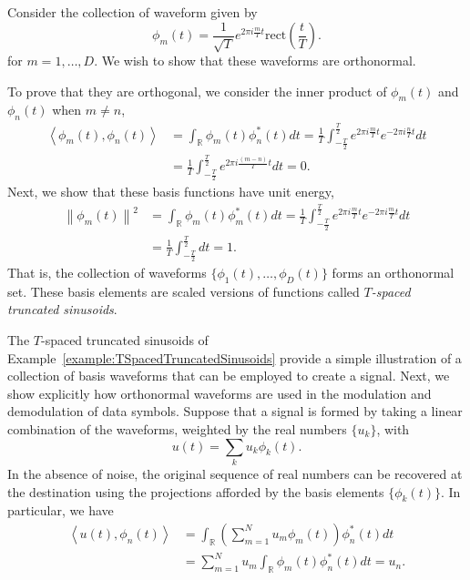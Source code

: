\begin{example} \label{example:TSpacedTruncatedSinusoids}
Consider the collection of waveform given by
\begin{equation*}
\phi_m(t) = \frac{1}{\sqrt{T}} e^{2 \pi i \frac{m}{T} t} \mathrm{rect} \left( \frac{t}{T} \right) .
\end{equation*}
for $m = 1, \ldots, D$.
We wish to show that these waveforms are orthonormal.

To prove that they are orthogonal, we consider the inner product of $\phi_m(t)$ and $\phi_n(t)$ when $m \neq n$,
\begin{equation*}
\begin{split}
\left\langle \phi_m (t), \phi_n (t) \right\rangle
&= \int_{\mathbb{R}} \phi_m (t) \phi_n^* (t) dt 
= \frac{1}{T} \int_{-\frac{T}{2}}^{\frac{T}{2}}
e^{2 \pi i \frac{m}{T} t} e^{- 2 \pi i \frac{n}{T} t} dt \\
&= \frac{1}{T} \int_{-\frac{T}{2}}^{\frac{T}{2}}
e^{2 \pi i \frac{(m-n)}{T} t} dt
= 0 .
\end{split}
\end{equation*}
Next, we show that these basis functions have unit energy,
\begin{equation*}
\begin{split}
\left\| \phi_m(t) \right\|^2
&= \int_{\mathbb{R}} \phi_m (t) \phi_m^* (t) dt 
= \frac{1}{T} \int_{-\frac{T}{2}}^{\frac{T}{2}}
e^{2 \pi i \frac{m}{T} t} e^{- 2 \pi i \frac{m}{T} t} dt \\
&= \frac{1}{T} \int_{-\frac{T}{2}}^{\frac{T}{2}} dt
= 1 .
\end{split}
\end{equation*}
That is, the collection of waveforms $\{ \phi_1 (t), \ldots, \phi_D (t) \}$ forms an orthonormal set.
These basis elements are scaled versions of functions called \emph{$T$-spaced truncated sinusoids}.
\end{example}

The $T$-spaced truncated sinusoids of Example~\ref{example:TSpacedTruncatedSinusoids} provide a simple illustration of a collection of basis waveforms that can be employed to create a signal.
Next, we show explicitly how orthonormal waveforms are used in the modulation and demodulation of data symbols.
Suppose that a signal is formed by taking a linear combination of the waveforms, weighted by the real numbers $\{ u_k \}$, with
\begin{equation*}
u(t) = \sum_{k} u_k \phi_k(t) .
\end{equation*}
In the absence of noise, the original sequence of real numbers can be recovered at the destination using the projections afforded by the basis elements $\{ \phi_k (t) \}$.
In particular, we have
\begin{equation*}
\begin{split}
\left\langle u(t), \phi_n(t) \right\rangle
&= \int_{\mathbb{R}}
\left( \sum_{m=1}^N u_m \phi_m(t) \right) \phi_n^*(t) dt \\
&= \sum_{m=1}^N u_m \int_{\mathbb{R}}
\phi_m(t) \phi_n^*(t) dt
= u_n .
\end{split}
\end{equation*}

